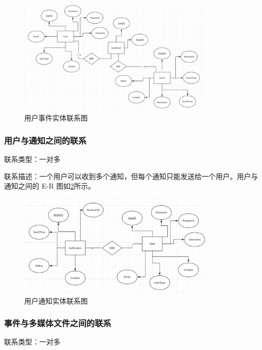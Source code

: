 \begin{figure}[h!]
    \centering
    \includegraphics[width=0.85\textwidth]{figures/db-img-rela-01.png}
    \caption{用户事件实体联系图}
    \label{fig:rela-user-event}
\end{figure}

\subsubsection{用户与通知之间的联系}

联系类型：一对多

联系描述：一个用户可以收到多个通知，但每个通知只能发送给一个用户。用户与通知之间的 E-R 图如\cref{fig:rela-user-notification}所示。

\begin{figure}[h!]
    \centering
    \includegraphics[width=0.85\textwidth]{figures/db-img-rela-02.png}
    \caption{用户通知实体联系图}
    \label{fig:rela-user-notification}
\end{figure}

\subsubsection{事件与多媒体文件之间的联系}

联系类型：一对多

